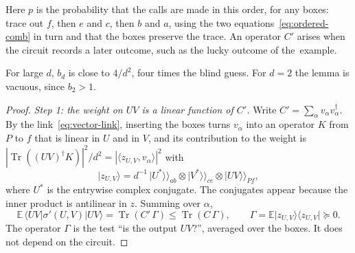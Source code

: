 \documentclass[11pt,letterpaper]{article}
\theoremstyle{definition}\newtheorem{definition}[theorem]{Definition}
\newcommand{\E}{\mathbb E}
\newcommand{\Tr}{\operatorname{Tr}}
\newcommand{\ket}[1]{\lvert#1\rangle}
\newcommand{\bra}[1]{\langle#1\rvert}
\newcommand{\proj}[1]{\ket{#1}\!\bra{#1}}
\newcommand{\vket}[1]{\lvert#1\rangle\!\rangle}
\begin{document}
Here $p$ is the probability that the calls are made in this order, for
any boxes: trace out $f$, then $e$ and $c$, then $b$ and $a$, using the
two equations~\eqref{eq:ordered-comb} in turn and that the boxes
preserve the trace. An operator $C'$ arises when the circuit records a
later outcome, such as the lucky outcome of the~example.

For large $d$, $b_d$ is close to $4/d^2$, four times the blind guess.
For $d=2$ the lemma is vacuous, since
$b_2>1$.

\begin{proof}
\emph{Step 1: the weight on $UV$ is a linear function of $C'$.} Write
$C'=\sum_\alpha v_\alpha v_\alpha^\dagger$. By the
link~\eqref{eq:vector-link}, inserting the boxes turns $v_\alpha$ into
an operator $K$ from $P$ to $f$ that is linear in $U$ and in $V$, and
its contribution to the weight is
$|\Tr((UV)^\dagger K)|^2/d^2=|\langle z_{U,V},v_\alpha\rangle|^2$ with
\[
 \ket{z_{U,V}}=d^{-1}\,\vket{U^*}_{ab}\otimes\vket{V^*}_{ce}\otimes\vket{UV}_{Pf},
\]
where $U^*$ is the entrywise complex conjugate. The conjugates appear
because the inner product is antilinear in $z$. Summing over $\alpha$,
\[
 \E\,\bra{UV}\sigma'(U,V)\ket{UV}=\Tr(C'\,\Gamma)\le\Tr(C\,\Gamma),\qquad
 \Gamma=\E\proj{z_{U,V}}\succeq0 .
\]
The operator $\Gamma$ is the test ``is the output $UV$?'', averaged
over the boxes. It does not depend on the circuit.


\end{proof}
\end{document}
